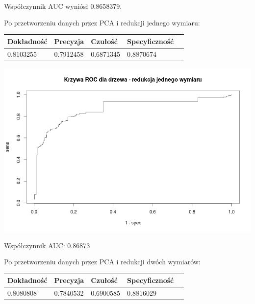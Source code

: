 \documentclass{article}
\begin{document}
Współczynnik AUC wyniósł 0.8658379.

Po przetworzeniu danych przez PCA i redukcji jednego wymiaru:

\begin{center}
    \begin{tabular}{| l | l | l | l | l|}
    \hline
        Dokładność &  Precyzja &  Czułość & Specyficzność \\ \hline
      	0.8103255 & 0.7912458 & 0.6871345 & 0.8870674  \\
    \hline
    \end{tabular}
\end{center}

\begin{center}
	\includegraphics[scale=0.40]{images/tree1.png}
\end{center}

Współczynnik AUC: 0.86873

Po przetworzeniu danych przez PCA i redukcji dwóch wymiarów:

\begin{center}
    \begin{tabular}{| l | l | l | l | l|}
    \hline
        Dokładność &  Precyzja &  Czułość & Specyficzność \\ \hline
      	0.8080808 & 0.7840532 & 0.6900585 & 0.8816029  \\
    \hline
    \end{tabular}
\end{center}
\end{document}
